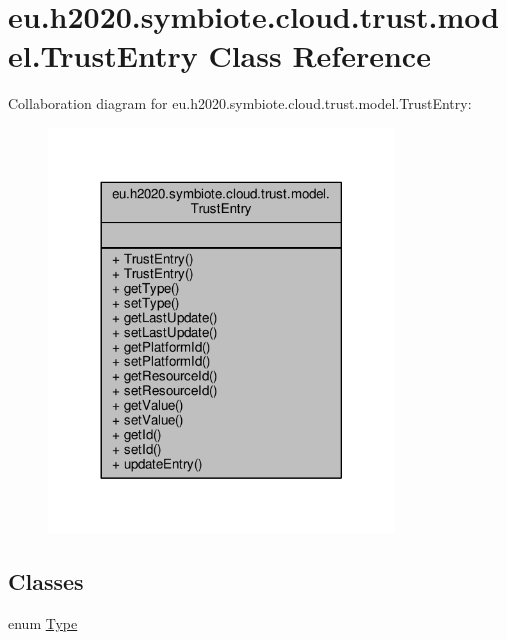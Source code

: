 \hypertarget{classeu_1_1h2020_1_1symbiote_1_1cloud_1_1trust_1_1model_1_1TrustEntry}{}\section{eu.\+h2020.\+symbiote.\+cloud.\+trust.\+model.\+Trust\+Entry Class Reference}
\label{classeu_1_1h2020_1_1symbiote_1_1cloud_1_1trust_1_1model_1_1TrustEntry}


Collaboration diagram for eu.\+h2020.\+symbiote.\+cloud.\+trust.\+model.\+Trust\+Entry\+:\nopagebreak
\begin{figure}[H]
\begin{center}
\leavevmode
\includegraphics[width=260pt]{classeu_1_1h2020_1_1symbiote_1_1cloud_1_1trust_1_1model_1_1TrustEntry__coll__graph}
\end{center}
\end{figure}
\subsection*{Classes}
\begin{DoxyCompactItemize}
\item 
enum \hyperlink{enumeu_1_1h2020_1_1symbiote_1_1cloud_1_1trust_1_1model_1_1TrustEntry_1_1Type}{Type}
\end{DoxyCompactItemize}
